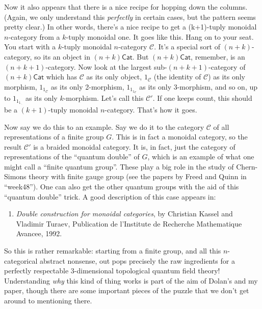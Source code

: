 \documentclass{article}
\def\tightlist{}
\begin{document}
Now it also appears that there is a nice recipe for hopping down the
columns. (Again, we only understand this \emph{perfectly} in certain
cases, but the pattern seems pretty clear.) In other words, there's a
nice recipe to get a (k+1)-tuply monoidal \(n\)-category from a
\(k\)-tuply monoidal one. It goes like this. Hang on to your seat. You
start with a \(k\)-tuply monoidal \(n\)-category \(\mathcal{C}\). It's a
special sort of \((n+k)\)-category, so its an object in
\((n+k)\mathsf{Cat}\). But \((n+k)\mathsf{Cat}\), remember, is an
\((n+k+1)\)-category. Now look at the largest sub-\((n+k+1)\)-category
of \((n+k)\mathsf{Cat}\) which has \(\mathcal{C}\) as its only object,
\(1_{\mathcal{C}}\) (the identity of \(\mathcal{C}\)) as its only
morphism, \(1_{1_{\mathcal{C}}}\) as its only 2-morphism,
\(1_{1_{1_{\mathcal{C}}}}\) as its only 3-morphism, and so on, up to
\(1_{1_{1_{\ddots}}}\) as its only \(k\)-morphism. Let's call this
\(\mathcal{C}'\). If one keeps count, this should be a \((k+1)\)-tuply
monoidal \(n\)-category. That's how it goes.

Now say we do this to an example. Say we do it to the category
\(\mathcal{C}\) of all representations of a finite group \(G\). This is
in fact a monoidal category, so the result \(\mathcal{C}'\) is a braided
monoidal category. It is, in fact, just the category of representations
of the ``quantum double'' of \(G\), which is an example of what one
might call a ``finite quantum group''. These play a big role in the
study of Chern-Simons theory with finite gauge group (see the papers by
Freed and Quinn in ``week48''). One can also get the other quantum
groups with the aid of this ``quantum double'' trick. A good description
of this case appears in:

\begin{enumerate}
\def\labelenumi{\arabic{enumi})}
\setcounter{enumi}{2}
\tightlist
\item
  \emph{Double construction for monoidal categories}, by Christian
  Kassel and Vladimir Turaev, Publication de l'Institute de Recherche
  Mathematique Avancee, 1992.
\end{enumerate}

So this is rather remarkable: starting from a finite group, and all this
\(n\)-categorical abstract nonsense, out pops precisely the raw
ingredients for a perfectly respectable 3-dimensional topological
quantum field theory! Understanding \emph{why} this kind of thing works
is part of the aim of Dolan's and my paper, though there are some
important pieces of the puzzle that we don't get around to mentioning
there.
\end{document}
